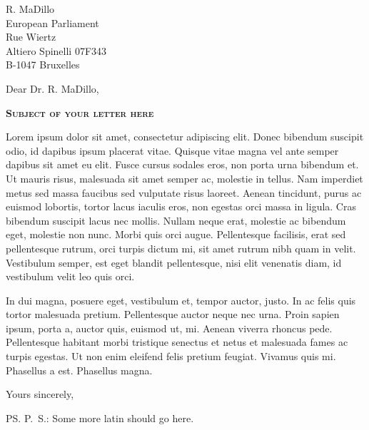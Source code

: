 \documentclass[a4paper,12pt]{letter}
\date{February 31, 2013}
\begin{document}
\begin{letter}{
    R. MaDillo\\
    European Parliament\\
    Rue Wiertz\\
    Altiero Spinelli 07F343\\
    B-1047 Bruxelles 
  }
  \opening{Dear Dr. R. MaDillo,}
{
  \begin{center}
    \textbf{\textsc{Subject of your letter here}}\\[2em]
  \end{center}
}
% 
%

Lorem ipsum dolor sit amet, consectetur adipiscing elit. Donec bibendum 
suscipit odio, id dapibus ipsum placerat vitae. Quisque vitae magna vel ante 
semper dapibus sit amet eu elit. Fusce cursus sodales eros, non porta urna 
bibendum et. Ut mauris risus, malesuada sit amet semper ac, molestie in 
tellus. Nam imperdiet metus sed massa faucibus sed vulputate risus laoreet. 
Aenean tincidunt, purus ac euismod lobortis, tortor lacus iaculis eros, non 
egestas orci massa in ligula. Cras bibendum suscipit lacus nec mollis. Nullam 
neque erat, molestie ac bibendum eget, molestie non nunc. Morbi quis orci 
augue. Pellentesque facilisis, erat sed pellentesque rutrum, orci turpis 
dictum mi, sit amet rutrum nibh quam in velit. Vestibulum semper, est eget 
blandit pellentesque, nisi elit venenatis diam, id vestibulum velit leo quis 
orci. 

In dui magna, posuere eget, vestibulum et, tempor auctor, justo. In ac felis 
quis tortor malesuada pretium. Pellentesque auctor neque nec urna. Proin 
sapien ipsum, porta a, auctor quis, euismod ut, mi. Aenean viverra rhoncus 
pede. Pellentesque habitant morbi tristique senectus et netus et malesuada 
fames ac turpis egestas. Ut non enim eleifend felis pretium feugiat. Vivamus 
quis mi. Phasellus a est. Phasellus magna.

\closing{Yours sincerely,}
%
\ps{P.\ S.: Some more latin should go here.}

\vspace{1cm}
\begingroup
\def\enotesize{\small}
\def\enoteheading{\Large \textsc{Notes}}
\theendnotes
\endgroup
\end{letter}
\end{document}

